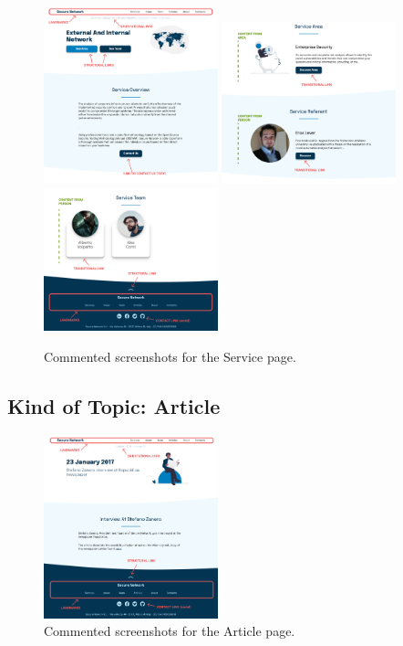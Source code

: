 \documentclass[12pt]{report}
\begin{document}
\begin{figure}[H]
	\centering
	\includegraphics[width=0.45\textwidth]{high_fid_wireframes/service/1.png}
	\includegraphics[width=0.45\textwidth]{high_fid_wireframes/service/2.png}
	\includegraphics[width=0.45\textwidth]{high_fid_wireframes/service/3.png}
	\caption{Commented screenshots for the Service page.}
\end{figure}

\subsection{Kind of Topic: Article}

\begin{figure}[H]
	\centering
	\includegraphics[width=0.45\textwidth]{high_fid_wireframes/article/1.png}
	\caption{Commented screenshots for the Article page.}
\end{figure}
\end{document}
